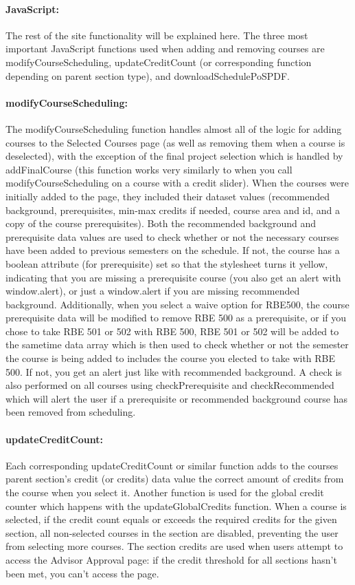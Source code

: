 \documentclass[12pt]{article}
\begin{document}
				\paragraph{JavaScript:}
					The rest of the site functionality will be explained here. The three most important JavaScript functions used when adding and removing courses are modifyCourseScheduling, updateCreditCount (or corresponding function depending on parent section type), and downloadSchedulePoSPDF. 
				\paragraph{modifyCourseScheduling:}
					The modifyCourseScheduling function handles almost all of the logic for adding courses to the Selected Courses page (as well as removing them when a course is deselected), with the exception of the final project selection which is handled by addFinalCourse (this function works very similarly to when you call modifyCourseScheduling on a course with a credit slider). When the courses were initially added to the page, they included their dataset values (recommended background, prerequisites, min-max credits if needed, course area and id, and a copy of the course prerequisites). Both the recommended background and prerequisite data values are used to check whether or not the necessary courses have been added to previous semesters on the schedule. If not, the course has a boolean attribute (for prerequisite) set so that the stylesheet turns it yellow, indicating that you are missing a prerequisite course (you also get an alert with window.alert), or just a window.alert if you are missing recommended background. Additionally, when you select a waive option for RBE500, the course prerequisite data will be modified to remove RBE 500 as a prerequisite, or if you chose to take RBE 501 or 502 with RBE 500, RBE 501 or 502 will be added to the sametime data array which is then used to check whether or not the semester the course is being added to includes the course you elected to take with RBE 500. If not, you get an alert just like with recommended background. A check is also performed on all courses using checkPrerequisite and checkRecommended which will alert the user if a prerequisite or recommended background course has been removed from scheduling. 
				\paragraph{updateCreditCount:}
					Each corresponding updateCreditCount or similar function adds to the courses parent section's credit (or credits) data value the correct amount of credits from the course when you select it. Another function is used for the global credit counter which happens with the updateGlobalCredits function. When a course is selected, if the credit count equals or exceeds the required credits for the given section, all non-selected courses in the section are disabled, preventing the user from selecting more courses. The section credits are used when users attempt to access the Advisor Approval page: if the credit threshold for all sections hasn't been met, you can't access the page.
\end{document}
